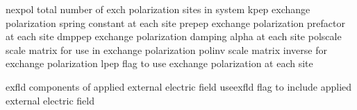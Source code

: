 \documentclass[letterpaper,11pt,english]{sphinxmanual}
\begin{document}
\sphinxAtStartPar
{}

\begin{sphinxVerbatim}[commandchars=\\\{\}]
nexpol          total number of exch polarization sites in system
kpep            exchange polarization spring constant at each site
prepep          exchange polarization prefactor at each site
dmppep          exchange polarization damping alpha at each site
polscale        scale matrix for use in exchange polarization
polinv          scale matrix inverse for exchange polarization
lpep            flag to use exchange polarization at each site
\end{sphinxVerbatim}

\sphinxAtStartPar
{}

\begin{sphinxVerbatim}[commandchars=\\\{\}]
exfld           components of applied external electric field
use\PYGZus{}exfld       flag to include applied external electric field
\end{sphinxVerbatim}

\sphinxAtStartPar
{}
\end{document}
